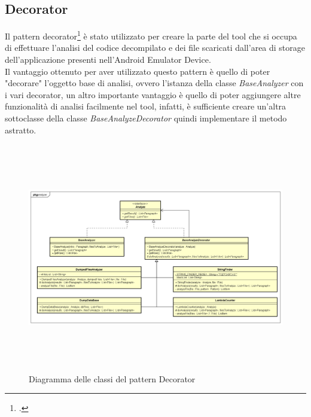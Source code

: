 \subsection{Decorator}\label{subsec:decorator}
Il pattern decorator\footcite{womak:decorator} è stato utilizzato per creare la parte del tool che si occupa di effettuare l'analisi del codice decompilato e dei file scaricati dall'area di storage dell'applicazione presenti nell'Android Emulator Device.\\
Il vantaggio ottenuto per aver utilizzato questo pattern è quello di poter "decorare" l'oggetto base di analisi, ovvero l'istanza della classe \textit{BaseAnalyzer} con i vari decorator, un altro importante vantaggio è quello di poter aggiungere altre funzionalità di analisi facilmente nel tool, infatti, è sufficiente creare un'altra sottoclasse della classe \textit{BaseAnalyzeDecorator} quindi implementare il metodo astratto.
\begin{figure}[H]
    \centering
    \includegraphics[width=14cm, height=10cm]{./immagini/diagrammi_uml/Decorator.png}
    \caption{Diagramma delle classi del pattern Decorator}\label{fig:decorator}
\end{figure}

\newpage
